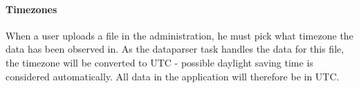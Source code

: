 \paragraph{Timezones}
\label{sec:timezones}
When a user uploads a file in the administration, he must pick what timezone the data has been observed in. As the dataparser task handles the data for this file, the timezone will be converted to UTC - possible daylight saving time is considered automatically. All data in the application will therefore be in UTC.
